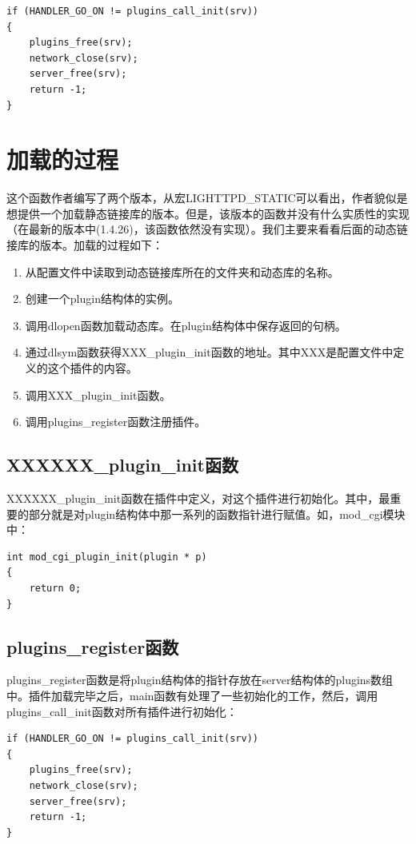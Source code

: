 \documentclass[dvipdfm]{book}
\begin{document}
\begin{verbatim}
if (HANDLER_GO_ON != plugins_call_init(srv)) 
{
	plugins_free(srv);
	network_close(srv);
	server_free(srv);
	return -1;
}
\end{verbatim}


\section{加载的过程}
这个函数作者编写了两个版本，从宏LIGHTTPD\_STATIC可以看出，作者貌似是想提供一个加载静态链接库的版本。但是，该版本的函数并没有什么实质性的实现（在最新的版本中(1.4.26)，该函数依然没有实现）。我们主要来看看后面的动态链接库的版本。加载的过程如下：
\begin{enumerate}
	\item 从配置文件中读取到动态链接库所在的文件夹和动态库的名称。
	\item 创建一个plugin结构体的实例。
	\item 调用dlopen函数加载动态库。在plugin结构体中保存返回的句柄。
	\item 通过dlsym函数获得XXX\_plugin\_init函数的地址。其中XXX是配置文件中定义的这个插件的内容。
	\item 调用XXX\_plugin\_init函数。
	\item 调用plugins\_register函数注册插件。
\end{enumerate}

\subsection{XXXXXX\_plugin\_init函数}
XXXXXX\_plugin\_init函数在插件中定义，对这个插件进行初始化。其中，最重要的部分就是对plugin结构体中那一系列的函数指针进行赋值。如，mod\_cgi模块中：

\begin{verbatim}
int mod_cgi_plugin_init(plugin * p)
{
	return 0;
}
\end{verbatim}


\subsection{plugins\_register函数}
plugins\_register函数是将plugin结构体的指针存放在server结构体的plugins数组中。插件加载完毕之后，main函数有处理了一些初始化的工作，然后，调用plugins\_call\_init函数对所有插件进行初始化：

\begin{verbatim}
if (HANDLER_GO_ON != plugins_call_init(srv)) 
{
	plugins_free(srv);
	network_close(srv);
	server_free(srv);
	return -1;
}
\end{verbatim}
\end{document}
